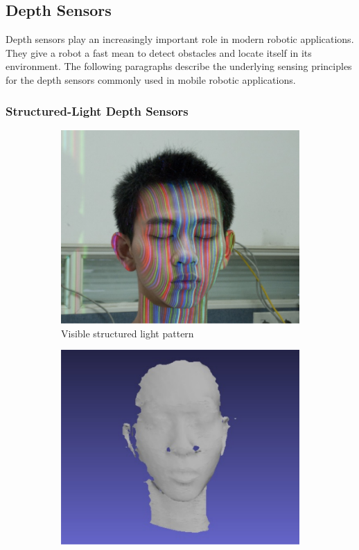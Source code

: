 \subsection{Depth Sensors}

Depth sensors play an increasingly important role in modern robotic applications.
They give a robot a fast mean to detect obstacles and locate itself in its environment.
The following paragraphs describe the underlying sensing principles\cite{blais_2003} for the depth sensors commonly used in mobile robotic applications.

\subsubsection{Structured-Light Depth Sensors}

\begin{figure}[H]
    \centering
    \begin{subfigure}[t]{0.45\textwidth}
        \includegraphics[width=\textwidth]{chapter03/img/depth_pattern_face.png}
        \caption{Visible structured light pattern}
    \end{subfigure}
    \begin{subfigure}[t]{0.45\textwidth}
        \includegraphics[width=\textwidth]{chapter03/img/depth_face_reconstructed.png}

\end{subfigure}
\end{figure}
